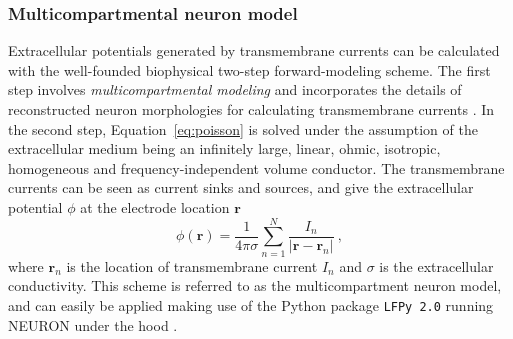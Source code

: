 \documentclass[preprint,10pt,authoryear]{elsarticle}
\begin{document}
\subsubsection{Multicompartmental neuron model}
Extracellular potentials generated by transmembrane currents can be calculated with the well-founded biophysical two-step forward-modeling scheme. The first step involves \textit{multicompartmental modeling} and incorporates the details of reconstructed neuron morphologies for calculating transmembrane currents \citep{STERRATT2011}. In the second step, Equation~\eqref{eq:poisson} is solved under the assumption of the extracellular medium being an infinitely large, linear, ohmic, isotropic, homogeneous and frequency-independent volume conductor. The transmembrane currents can be seen as current sinks and sources, and give the extracellular potential $\phi$ at the electrode location $\mathbf{r}$
\begin{equation}
\phi(\mathbf{r}) = \frac{1}{4 \pi \sigma}\sum_{n=1}^N \frac{I_n}{|\mathbf{r} - \mathbf{r}_n|}~,
\label{eq:point_source}
\end{equation}
where $\mathbf{r}_n$ is the location of transmembrane current $I_n$ and $\sigma$ is the extracellular conductivity.
This scheme is referred to as the multicompartment neuron model, and can easily be applied making use of the Python package \texttt{LFPy 2.0} running NEURON under the hood \citep{HAGEN2017,CARNEVALE2006}.
\end{document}
